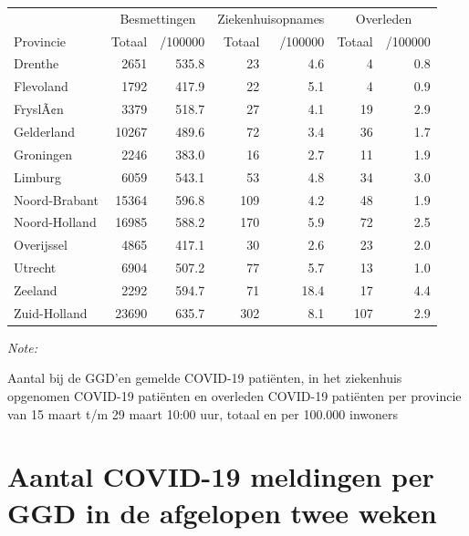\documentclass[
  english,
  man,floatsintext]{apa6}
\begin{document}
\begin{table}
\centering
\begin{threeparttable}
\begin{tabular}{lrrrrrr}
\toprule
\multicolumn{1}{c}{ } & \multicolumn{2}{c}{Besmettingen} & \multicolumn{2}{c}{Ziekenhuisopnames} & \multicolumn{2}{c}{Overleden} \\
\cmidrule(l{3pt}r{3pt}){2-3} \cmidrule(l{3pt}r{3pt}){4-5} \cmidrule(l{3pt}r{3pt}){6-7}
Provincie & Totaal & /100000 & Totaal & /100000 & Totaal & /100000\\
\midrule
Drenthe & 2651 & 535.8 & 23 & 4.6 & 4 & 0.8\\
Flevoland & 1792 & 417.9 & 22 & 5.1 & 4 & 0.9\\
FryslÃ¢n & 3379 & 518.7 & 27 & 4.1 & 19 & 2.9\\
Gelderland & 10267 & 489.6 & 72 & 3.4 & 36 & 1.7\\
Groningen & 2246 & 383.0 & 16 & 2.7 & 11 & 1.9\\
Limburg & 6059 & 543.1 & 53 & 4.8 & 34 & 3.0\\
Noord-Brabant & 15364 & 596.8 & 109 & 4.2 & 48 & 1.9\\
Noord-Holland & 16985 & 588.2 & 170 & 5.9 & 72 & 2.5\\
Overijssel & 4865 & 417.1 & 30 & 2.6 & 23 & 2.0\\
Utrecht & 6904 & 507.2 & 77 & 5.7 & 13 & 1.0\\
Zeeland & 2292 & 594.7 & 71 & 18.4 & 17 & 4.4\\
Zuid-Holland & 23690 & 635.7 & 302 & 8.1 & 107 & 2.9\\
\bottomrule
\end{tabular}
\begin{tablenotes}
\item \textit{Note: } 
\item Aantal bij de GGD’en gemelde COVID-19 patiënten, in het ziekenhuis opgenomen COVID-19 patiënten en overleden COVID-19 patiënten per provincie van 15 maart t/m 29 maart 10:00 uur, totaal en per 100.000 inwoners
\end{tablenotes}
\end{threeparttable}
\end{table}

\newpage

\hypertarget{aantal-covid-19-meldingen-per-ggd-in-de-afgelopen-twee-weken}{%
\section{Aantal COVID-19 meldingen per GGD in de afgelopen twee weken}\label{aantal-covid-19-meldingen-per-ggd-in-de-afgelopen-twee-weken}}
\end{document}

